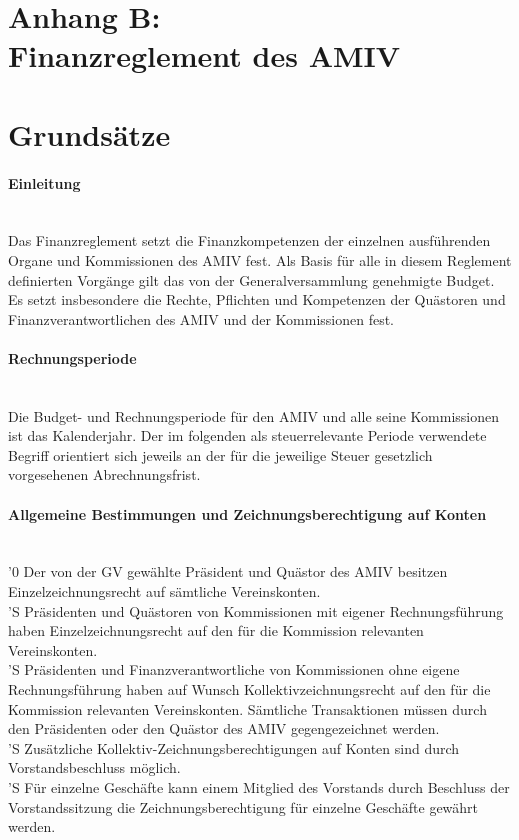 \documentclass[a4paper,11pt]{article}
\newcommand{\nl}{\\[1.5ex]}
\begin{document}
\newpage
\section*{Anhang B:\\ Finanzreglement des AMIV}
\section*{Grundsätze}
\paragraph{Einleitung} \ \\
Das Finanzreglement setzt die Finanzkompetenzen der einzelnen ausführenden Organe und Kommissionen des AMIV fest. Als Basis für alle in diesem Reglement definierten Vorgänge gilt das von der Generalversammlung genehmigte Budget. Es setzt insbesondere die Rechte, Pflichten und Kompetenzen der Quästoren und Finanzverantwortlichen des AMIV und der Kommissionen fest.


\paragraph{Rechnungsperiode} \ \\
Die Budget- und Rechnungsperiode für den AMIV und alle seine Kommissionen ist das Kalenderjahr. Der im folgenden als steuerrelevante Periode verwendete Begriff orientiert sich jeweils an der für die jeweilige Steuer gesetzlich vorgesehenen Abrechnungsfrist.


\paragraph{Allgemeine Bestimmungen und Zeichnungsberechtigung auf Konten} \ \\
'0 Der von der GV gewählte Präsident und Quästor des AMIV besitzen Einzelzeichnungsrecht auf sämtliche Vereinskonten.\nl
'S Präsidenten und Quästoren von Kommissionen mit eigener Rechnungsführung haben Einzelzeichnungsrecht auf den für die Kommission relevanten Vereinskonten.\nl
'S Präsidenten und Finanzverantwortliche von Kommissionen ohne eigene Rechnungsführung haben auf Wunsch Kollektivzeichnungsrecht auf den für die Kommission relevanten Vereinskonten. Sämtliche Transaktionen müssen durch den Präsidenten oder den Quästor des AMIV gegengezeichnet werden.\nl
'S Zusätzliche Kollektiv-Zeichnungsberechtigungen auf Konten sind durch Vorstandsbeschluss möglich.\nl
'S Für einzelne Geschäfte kann einem Mitglied des Vorstands durch Beschluss der Vorstandssitzung die Zeichnungsberechtigung für einzelne Geschäfte gewährt werden.
\end{document}
